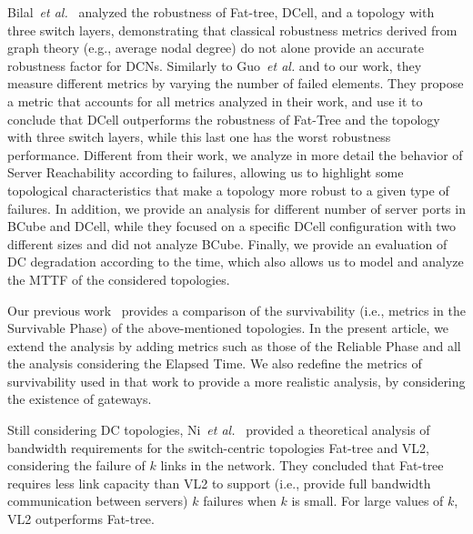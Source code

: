 Bilal~\textit{et al.}~\cite{bilal2013Characterization} analyzed the robustness of Fat-tree, DCell, and a topology with three switch layers, demonstrating that classical robustness metrics derived from graph theory (e.g., average nodal degree) do not alone provide an accurate robustness factor for DCNs. Similarly to Guo~\textit{et al.} and to our work, they measure different metrics by varying the number of failed elements. They propose a metric that accounts for all metrics analyzed in their work, and use it to conclude that DCell outperforms the robustness of Fat-Tree and the topology with three switch layers, while this last one has the worst robustness performance. Different from their work, we analyze in more detail the behavior of Server Reachability according to failures, allowing us to highlight some topological characteristics that make a topology more robust to a given type of failures.
In addition, we provide an analysis for different number of server ports in BCube and DCell, while they focused on a specific DCell configuration with two different sizes and did not analyze BCube. Finally, we provide an evaluation of DC degradation according to the time, which also allows us to model and analyze the MTTF of the considered topologies.

Our previous work~\cite{couto2012Reliability} provides a comparison of the survivability (i.e., metrics in the Survivable Phase) of the above-mentioned topologies. In the present article, we extend the 
analysis by adding metrics such as those of the Reliable Phase and all the analysis considering the Elapsed Time. We also redefine the metrics of survivability used in that work to provide a more realistic analysis, by considering the existence of gateways. 

Still considering DC topologies, Ni~\textit{et al.}~\cite{ni2014provisioning} provided a theoretical analysis of bandwidth requirements for the switch-centric topologies Fat-tree and VL2, considering the failure of $k$ links in the network. They concluded that Fat-tree requires less link capacity than VL2 to support (i.e., provide full bandwidth communication between servers) $k$ failures when $k$ is small. For large values of $k$, VL2 outperforms Fat-tree.

